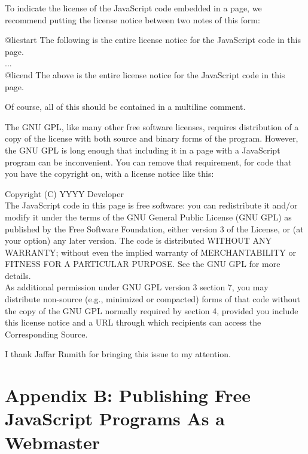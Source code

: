To indicate the license of the JavaScript code embedded in a page, we
recommend putting the license notice between two notes of this form:

\begin{quot}
    @licstart  The following is the entire license notice for the 
    JavaScript code in this page.\\
    ...\\
    @licend  The above is the entire license notice
    for the JavaScript code in this page.
\end{quot}

\noindent
Of course, all of this should be contained in a multiline comment.

The GNU GPL, like many other free software licenses, requires
distribution of a copy of the license with both source and binary
forms of the program.  However, the GNU GPL is long enough that
including it in a page with a JavaScript program can be inconvenient.
You can remove that requirement, for code that you have the copyright
on, with a license notice like this:

\begin{quot}
    Copyright (C) YYYY  Developer\\

    The JavaScript code in this page is free software: you can
    redistribute it and/or modify it under the terms of the GNU
    General Public License (GNU GPL) as published by the Free Software
    Foundation, either version 3 of the License, or (at your option)
    any later version.  The code is distributed WITHOUT ANY WARRANTY;
    without even the implied warranty of MERCHANTABILITY or FITNESS
    FOR A PARTICULAR PURPOSE.  See the GNU GPL for more details.\\

    As additional permission under GNU GPL version 3 section 7, you
    may distribute non-source (e.g., minimized or compacted) forms of
    that code without the copy of the GNU GPL normally required by
    section 4, provided you include this license notice and a URL
    through which recipients can access the Corresponding Source.
\end{quot}

I thank 
Jaffar Rumith for bringing this issue to my attention.

\section*{Appendix B: Publishing Free JavaScript Programs As a Webmaster}

